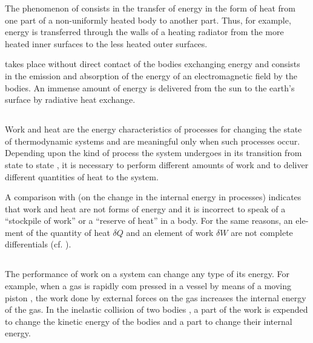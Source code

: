 The phenomenon of  consists in the transfer of energy in the form of heat from one part of a non-uniformly heated body to another part. Thus, for example, energy is transferred through the walls of a heating radiator from the more heated inner surfaces to the less heated outer sur­faces.

 takes place without direct contact of the bodies exchanging energy and consists in the emission and absorption of the energy of an electromagnetic field by the bodies. An immense amount of energy is delivered from the sun to the earth's surface by radiative heat exchange.

\subsection{}\label{9.2.5} Work and heat are the energy characteristics of processes for changing the state of thermodynamic systems and are meaningful only when such processes occur. Depending upon the kind of process the system undergoes in its transition from state  to state , it is necessary to perform different amounts of work and to deliver different quantities of heat to the system. 

A comparison with  (on the change in the internal energy in processes) indicates that work and heat are not forms of energy and it is incorrect to speak of a ``stockpile of work'' or a ``reserve of heat'' in a body. For the same reasons, an ele­ment of the quantity of heat $\delta Q$ and an element of work $\delta W$ are not complete differentials (cf. ).

\subsection{}\label{9.2.6} The performance of work on a system can change any type of its energy. For example, when a gas is rapidly com­ pressed in a vessel by means of a moving piston , the work done by external forces on the gas increases the internal energy of the gas. In the inelastic collision of two bodies , a part of the work is expended to change the kinetic energy of the bodies  and a part to change their internal energy.

